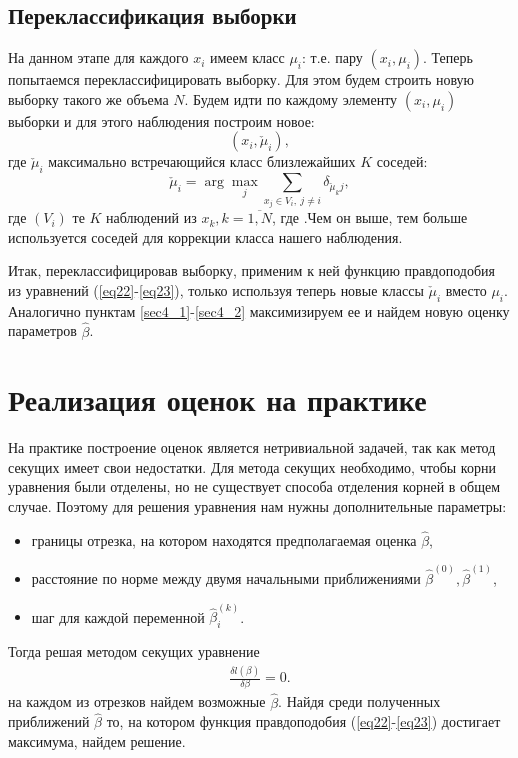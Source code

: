 \documentclass[a4paper,14pt]{extarticle}
\begin{document}
\subsection{Переклассификация выборки}\label{sec4_3}
На данном этапе для каждого $x_i$ имеем класс $\mu_i$: т.е. пару $(x_i,\mu_i)$.
Теперь попытаемся переклассифицировать выборку. 
Для этом будем строить новую выборку такого же объема $N$.
Будем идти по каждому элементу $(x_i, \mu_i)$ выборки и для этого наблюдения построим новое:
\begin{equation}
    (x_i, \check{\mu}_i),
\end{equation}
где $\check{\mu}_i$ максимально встречающийся класс близлежайших $K$ соседей:
\begin{equation}
    \check{\mu}_i = \arg\max_j \sum_{x_j\in V_i,~j\neq i} \delta_{\check{\mu}_k j},
\end{equation}
где $(V_i)$ те $K$ наблюдений из $x_k, k=\overline{1,N}$, где .Чем он выше, тем больше используется соседей для коррекции класса нашего наблюдения.

Итак, переклассифицировав выборку, применим к ней функцию правдоподобия из уравнений (\ref{eq22}-\ref{eq23}), только используя теперь новые классы $\check{\mu}_i$ вместо $\mu_i$. 
Аналогично пунктам \ref{sec4_1}-\ref{sec4_2} максимизируем ее и найдем новую оценку параметров $\hat{\beta}$.

\newpage
\section{Реализация оценок на практике}
На практике построение оценок является нетривиальной задачей, так как метод секущих имеет свои недостатки.
Для метода секущих необходимо, чтобы корни уравнения были отделены, но не существует способа отделения корней в общем случае.
Поэтому для решения уравнения нам нужны дополнительные параметры:
\begin{itemize}
    \item границы отрезка, на котором находятся предполагаемая оценка $\hat{\beta}$,
    \item расстояние по норме между двумя начальными приближениями $\hat{\beta}^{(0)}, \hat{\beta}^{(1)}$,
    \item шаг для каждой переменной $\hat{\beta}_i^{(k)}$.
\end{itemize}
Тогда решая методом секущих уравнение
\begin{eqnarray}
    \frac{\delta l (\beta)}{\delta \beta}=0.
\end{eqnarray}
на каждом из отрезков найдем возможные $\hat{\beta}$. Найдя среди полученных приближений $\hat{\beta}$ то, 
на котором функция правдоподобия (\ref{eq22}-\ref{eq23}) достигает максимума, 
найдем решение.
\end{document}

